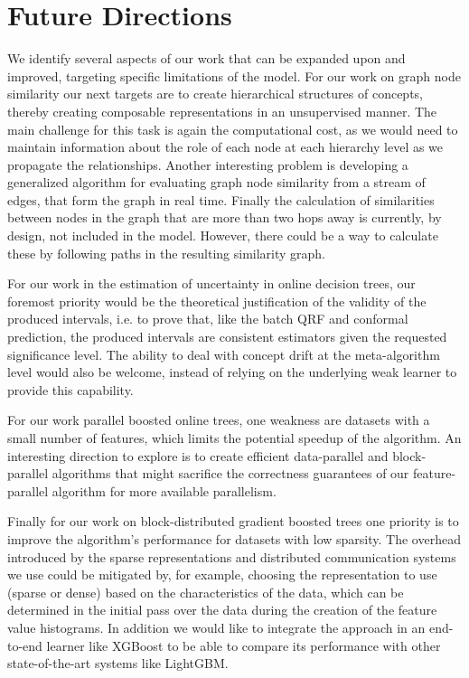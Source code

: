 \section{Future Directions}

We identify several aspects of our work that can be expanded upon and improved,
targeting specific limitations of the model. For our work on graph node similarity
our next targets are to create hierarchical structures of concepts, thereby creating
composable representations in an unsupervised manner. The main challenge for this
task is again the computational cost, as we would need to maintain information
about the role of each node at each hierarchy level as we propagate the relationships.
Another interesting problem is developing
a generalized algorithm for evaluating graph node similarity from a stream of edges,
that form the graph in real time. Finally the calculation of similarities between
nodes in the graph that are more than two hops away is currently, by design, not included
in the model. However, there could be a way to calculate these by following paths in
the resulting similarity graph.

For our work in the estimation of uncertainty in online decision trees, our foremost
priority would be the theoretical justification of the validity of the produced intervals,
i.e. to prove that, like the batch QRF and conformal prediction, the produced intervals
are consistent estimators given the requested significance level. The ability to
deal with concept drift at the meta-algorithm level would also be welcome, instead
of relying on the underlying weak learner to provide this capability.

For our work parallel boosted online trees, one weakness are datasets with
a small number of features, which limits the potential speedup of the
algorithm.
An interesting direction to explore is to
create efficient data-parallel and block-parallel algorithms that might sacrifice
the correctness guarantees of our feature-parallel algorithm for more available
parallelism.

Finally for our work on block-distributed gradient boosted trees one priority is to
improve the algorithm's performance for datasets with low sparsity. The overhead
introduced by the sparse representations and distributed communication systems we use could be mitigated by,
for example, choosing the representation to use (sparse or dense) based on the
characteristics of the data, which can be determined in the initial pass over the
data during the creation of the feature value histograms. In addition we would
like to integrate the approach in an end-to-end learner like XGBoost to be able
to compare its performance with other state-of-the-art systems like LightGBM.
